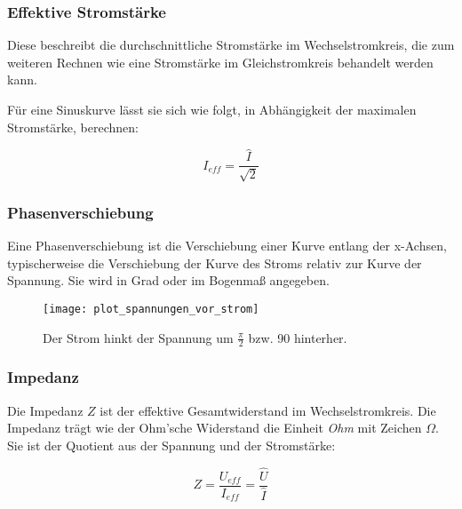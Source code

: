 \subsubsection{Effektive Stromstärke}

Diese beschreibt die durchschnittliche Stromstärke im Wechselstromkreis, die zum weiteren Rechnen wie eine Stromstärke im Gleichstromkreis behandelt werden kann.

Für eine Sinuskurve lässt sie sich wie folgt, in Abhängigkeit der maximalen Stromstärke, berechnen:

\begin{equation}	\label{eq:EffektiveStromstaerke}
	I_{eff}=\frac{\hat{I}}{\sqrt{2}}
\end{equation}


\subsubsection{Phasenverschiebung}

Eine Phasenverschiebung ist die Verschiebung einer Kurve entlang der x-Achsen, typischerweise die Verschiebung der Kurve des Stroms relativ zur Kurve der Spannung. Sie wird in Grad oder im Bogenmaß angegeben.


\begin{figure}[h!]
	\centering
	\begin{comment} Gnuplot: xpitics.p
set xlabel "t"
set ylabel "I, U"
set output "plot_spannungen_vor_strom.png"
plot cos(x)*0.7 title "Strom" ls 1, sin(x) title "Spannung" ls 3
	\end{comment}
	\texttt{[image: plot\_spannungen\_vor\_strom]}
	\caption{\glqq Der Strom hinkt der Spannung um $\frac{\pi}{2}$ bzw. 90\degree{} hinterher.\grqq }
\end{figure}



\subsubsection{Impedanz}

Die Impedanz $Z$ ist der effektive Gesamtwiderstand im Wechselstromkreis. Die Impedanz trägt wie der Ohm'sche Widerstand die Einheit \emph{Ohm} mit Zeichen $\Omega$. Sie ist der Quotient aus der Spannung und der Stromstärke:

\begin{equation}		\label{eq:Impedanz}
	Z = \frac{U_{eff}}{I_{eff}}
	  = \frac{\hat{U}}{\hat{I}}
\end{equation}



